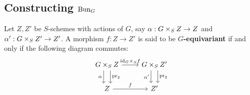     \subsection{Constructing \texorpdfstring{$\mathrm{Bun}_G$}{}}
        \begin{definition}[Equivariance] \label{def: equivariance}
            Let $Z, Z'$ be $S$-schemes with actions of $G$, say $\alpha: G \x_S Z \to Z$ and $\alpha': G \x_S Z' \to Z'$. A morphism $f: Z \to Z'$ is said to be \textbf{$G$-equivariant} if and only if the following diagram commutes:
                $$
                    \begin{tikzcd}
                    {G \x_S Z} & {G \x_S Z'} \\
                    Z & {Z'}
                    \arrow["{\id_G \x_S f}", from=1-1, to=1-2]
                    \arrow["\alpha"', shift right=2, from=1-1, to=2-1]
                    \arrow["{\pr_2}", shift left=2, from=1-1, to=2-1]
                    \arrow["{\pr_2}", shift left=2, from=1-2, to=2-2]
                    \arrow["{\alpha'}"', shift right=2, from=1-2, to=2-2]
                    \arrow["f", from=2-1, to=2-2]
                    \end{tikzcd}
                $$
        \end{definition}
